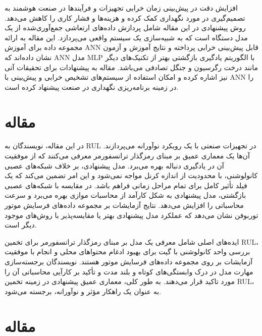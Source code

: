 \documentclass[a4paper,10pt]{article}
\begin{document}
افزایش دقت در پیش‌بینی زمان خرابی تجهیزات و فرآیندها در صنعت هوشمند به تصمیم‌گیری در مورد نگهداری کمک کرده و هزینه‌ها و فشار کاری را کاهش می‌دهد. روش پیشنهادی در این مقاله شامل پردازش داده‌های ارتعاشی جمع‌آوری‌شده از یک مدل دستگاه است که به شبیه‌سازی یک سیستم واقعی می‌پردازد. این مقاله به ارائه مجموعه داده برای آموزش ANN قابل پیش‌بینی خرابی پرداخته و نتایج آموزش و آزمون نشان داده‌اند که ANN مدل MLP با الگوریتم یادگیری بازگشتی بهتر از تکنیک‌های دیگر مانند درخت رگرسیون و جنگل تصادفی می‌باشد. مقاله به پیشنهادات برای تحقیقات آتی نیز اشاره کرده و امکان استفاده از سیستم‌های تشخیص خرابی و پیش‌بینی با ANN را در زمینه برنامه‌ریزی نگهداری در صنعت پیشنهاد کرده است.


	\section{مقاله \textcolor{blue}{\cite{article45}}}
در این مقاله، نویسندگان به RUL در تجهیزات صنعتی با یک رویکرد نوآورانه می‌پردازند. آن‌ها یک معماری عمیق بر مبنای رمزگذار ترانسفورمر معرفی می‌کنند که از موفقیت آن در یادگیری دنباله بهره می‌برد. مدل پیشنهادی، بر خلاف شبکه‌های عصبی کانولوشنی، با محدودیت از اندازه کرنل مواجه نمی‌شود و این امر تضمین می‌کند که یک فیلد تأثیر کامل برای تمام مراحل زمانی فراهم باشد. در مقایسه با شبکه‌های عصبی بازگشتی، مدل پیشنهادی به شکل کارآمد از محاسبات موازی بهره می‌برد و سرعت محاسباتی را افزایش می‌دهد. نتایج آزمایشات بر مجموعه داده‌های فرسایش موتور توربوفن نشان می‌دهد که عملکرد مدل پیشنهادی بهتر یا مقایسه‌پذیر با روش‌های موجود دیگر است.

ایده‌های اصلی شامل معرفی یک مدل بر مبنای رمزگذار ترانسفورمر برای تخمین RUL، بررسی واحد کانولوشنی با گیت برای بهبود ادغام محتواهای محلی و انجام با موفقیت آزمایشات بر روی مجموعه داده‌های فرسایش موتور هستند. نویسندگان برجسته‌سازی مهارت مدل در درک وابستگی‌های کوتاه و بلند مدت و تأکید بر کارآیی محاسباتی آن را مورد تاکید قرار می‌دهند. به طور کلی، معماری عمیق پیشنهادی در زمینه تخمین RUL، به عنوان یک راهکار مؤثر و نوآورانه، برجسته می‌شود.

	
	\section{مقاله \textcolor{blue}{\cite{article43}}}
	
\end{document}
